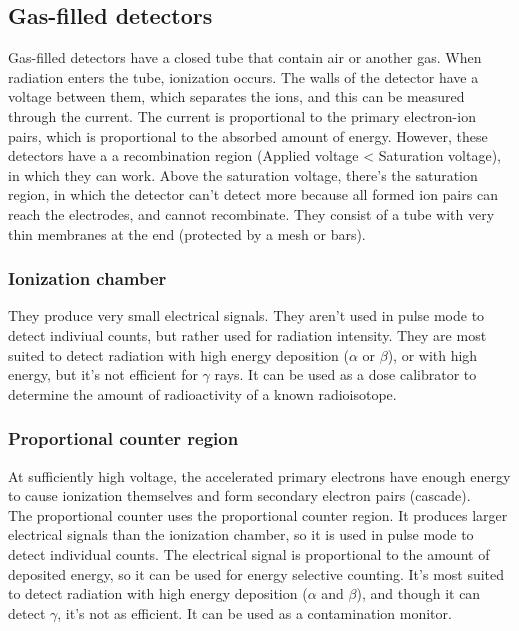\subsection{Gas-filled detectors}
Gas-filled detectors have a closed tube that contain air or another gas. When radiation enters the tube, ionization occurs. The walls of the detector have a voltage between them, which separates the ions, and this can be measured through the current. The current is proportional to the primary electron-ion pairs, which is proportional to the absorbed amount of energy. However, these detectors have a a recombination region (Applied voltage < Saturation voltage), in which they can work. Above the saturation voltage, there's the saturation region, in which the detector can't detect more because all formed ion pairs can reach the electrodes, and cannot recombinate. They consist of a tube with very thin membranes at the end (protected by a mesh or bars).\\

\subsubsection{Ionization chamber}
They produce very small electrical signals. They aren't used in pulse mode to detect indiviual counts, but rather used for radiation intensity. They are most suited to detect radiation with high energy deposition ($\alpha$ or $\beta$), or with high energy, but it's not efficient for $\gamma$ rays. It can be used as a dose calibrator to determine the amount of radioactivity of a known radioisotope.

\subsubsection{Proportional counter region}
At sufficiently high voltage, the accelerated primary electrons have enough energy to cause ionization themselves and form secondary electron pairs (cascade).\\
The proportional counter uses the proportional counter region. It produces larger electrical signals than the ionization chamber, so it is used in pulse mode to detect individual counts. The electrical signal is proportional to the amount of deposited energy, so it can be used for energy selective counting. It's most suited to detect radiation with high energy deposition ($\alpha$ and $\beta$), and though it can detect $\gamma$, it's not as efficient. It can be used as a contamination monitor.

